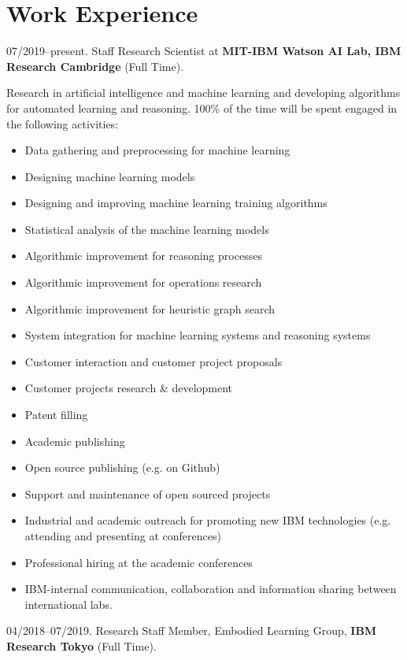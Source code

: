 \section{Work Experience}

\begin{CV}
\item[07/2019--present.] Staff Research Scientist at \textbf{MIT-IBM Watson AI Lab, IBM Research Cambridge} (Full Time).

 Research in artificial intelligence and machine learning and developing algorithms for automated learning and reasoning.
 100\% of the time will be spent engaged in the following activities:

\begin{itemize}
 \item Data gathering and preprocessing for machine learning
 \item Designing machine learning models
 \item Designing and improving machine learning training algorithms
 \item Statistical analysis of the machine learning models
 \item Algorithmic improvement for reasoning processes
 \item Algorithmic improvement for operations research
 \item Algorithmic improvement for heuristic graph search
 \item System integration for machine learning systems and reasoning systems
 \item Customer interaction and customer project proposals
 \item Customer projects research \& development
 \item Patent filling
 \item Academic publishing
 \item Open source publishing (e.g. on Github)
 \item Support and maintenance of open sourced projects
 \item Industrial and academic outreach for promoting new IBM technologies (e.g. attending and presenting at conferences)
 \item Professional hiring at the academic conferences
 \item IBM-internal communication, collaboration and information sharing between international labs.
\end{itemize}

\item[04/2018--07/2019.] Research Staff Member, Embodied Learning Group, \textbf{IBM Research Tokyo} (Full Time).


\end{CV}
